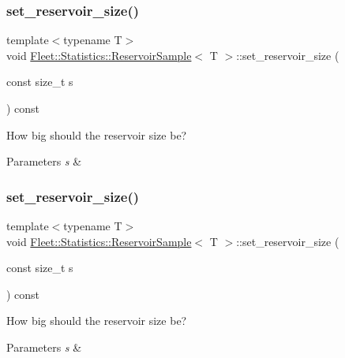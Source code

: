 \subsubsection{\texorpdfstring{set\+\_\+reservoir\+\_\+size()}{set\_reservoir\_size()}\hspace{0.1cm}{\footnotesize\ttfamily [1/2]}}
{\footnotesize\ttfamily template$<$typename T$>$ \\
void \hyperlink{class_fleet_1_1_statistics_1_1_reservoir_sample}{Fleet\+::\+Statistics\+::\+Reservoir\+Sample}$<$ T $>$\+::set\+\_\+reservoir\+\_\+size (\begin{DoxyParamCaption}\item[{const size\+\_\+t}]{s }\end{DoxyParamCaption}) const\hspace{0.3cm}{\ttfamily [inline]}}

How big should the reservoir size be? 
\begin{DoxyParams}{Parameters}
{\em s} & \\
\hline
\end{DoxyParams}
\mbox{\label{class_fleet_1_1_statistics_1_1_reservoir_sample_adabe7f40c91657950a67df7d20ace543}} 
\subsubsection{\texorpdfstring{set\+\_\+reservoir\+\_\+size()}{set\_reservoir\_size()}\hspace{0.1cm}{\footnotesize\ttfamily [2/2]}}
{\footnotesize\ttfamily template$<$typename T$>$ \\
void \hyperlink{class_fleet_1_1_statistics_1_1_reservoir_sample}{Fleet\+::\+Statistics\+::\+Reservoir\+Sample}$<$ T $>$\+::set\+\_\+reservoir\+\_\+size (\begin{DoxyParamCaption}\item[{const size\+\_\+t}]{s }\end{DoxyParamCaption}) const\hspace{0.3cm}{\ttfamily [inline]}}

How big should the reservoir size be? 
\begin{DoxyParams}{Parameters}
{\em s} & \\
\hline
\end{DoxyParams}
\mbox{\label{class_fleet_1_1_statistics_1_1_reservoir_sample_abdfad455c8b8da8cb2ab30d0f60053e0}} 
